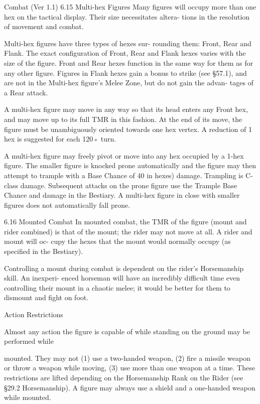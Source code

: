 \begin{Chapter}{Combat (Ver 1.1)}
6.15 Multi-hex Figures 
Many  figures  will  occupy  more  than  one  hex  on 
the  tactical  display.  Their  size  necessitates  altera-
tions in the resolution of movement and combat. 

Multi-hex  figures  have  three  types  of  hexes  sur-
rounding  them:  Front,  Rear  and  Flank.  The  exact 
configuration of Front, Rear and Flank hexes varies 
with  the  size  of  the  figure.  Front  and  Rear  hexes 
function in the same way for them as for any other 
figure.  Figures  in  Flank  hexes  gain  a  bonus  to 
strike  (see  §57.1),  and  are  not  in  the  Multi-hex 
figure’s  Melee  Zone,  but  do  not  gain  the  advan-
tages of a Rear attack. 

A multi-hex figure may move in any way so that its 
head enters any Front hex, and may move up to its 
full  TMR  in  this  fashion.  At  the  end  of  its  move, 
the figure must be unambiguously oriented towards 
one  hex  vertex.  A  reduction  of  1  hex  is  suggested 
for each 120◦ turn. 

A  multi-hex  figure  may  freely  pivot  or  move  into 
any  hex  occupied  by  a  1-hex  figure.  The  smaller 
figure  is  knocked  prone  automatically  and  the 
figure  may  then  attempt  to  trample  with  a  Base 
Chance of 40%
in  hexes)  damage.  Trampling  is  C-class  damage. 
Subsequent  attacks  on  the  prone  figure  use  the 
Trample Base Chance and damage in the Bestiary. 
A  multi-hex  figure  in  close  with  smaller  figures 
does not automatically fall prone. 

6.16 Mounted Combat 
In mounted combat, the TMR of the figure (mount 
and rider combined) is that of the mount; the rider 
may  not  move  at  all.  A  rider  and  mount  will  oc-
cupy  the  hexes  that  the  mount  would  normally 
occupy (as specified in the Bestiary). 

Controlling  a  mount  during  combat  is  dependent 
on  the  rider’s  Horsemanship  skill.  An  inexperi-
enced  horseman  will  have  an  incredibly  difficult 
time  even  controlling  their  mount  in  a  chaotic 
melee; it would be better for them to dismount and 
fight on foot. 

Action Restrictions 

Almost  any  action  the  figure  is  capable  of  while 
standing  on  the  ground  may  be  performed  while 

mounted.  They  may  not  (1)  use  a  two-handed 
weapon,  (2)  fire  a  missile  weapon  or  throw  a 
weapon  while  moving,  (3)  use  more  than  one 
weapon  at  a  time.  These  restrictions  are  lifted 
depending on the Horsemanship Rank on the Rider 
(see  §29.2  Horsemanship).  A  figure  may  always 
use  a  shield  and  a  one-handed  weapon  while 
mounted. 


\end{Chapter}
